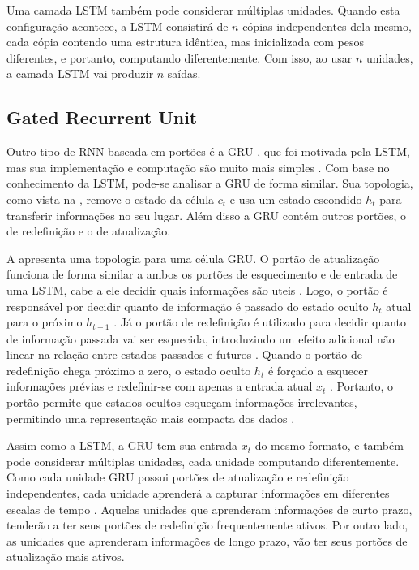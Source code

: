 Uma camada LSTM também pode considerar múltiplas unidades. Quando esta configuração acontece, a LSTM consistirá de $n$ cópias independentes dela mesmo, cada cópia contendo uma estrutura idêntica, mas inicializada com pesos diferentes, e portanto, computando diferentemente. Com isso, ao usar $n$ unidades, a camada LSTM vai produzir $n$ saídas. 

\subsection{Gated Recurrent Unit}
\label{sec:gru}

Outro tipo de \acrshort{RNN} baseada em portões é a \acrfull{GRU} \cite{gru}, que foi motivada pela \acrshort{LSTM}, mas sua implementação e computação são muito mais simples \cite{gru}. Com base no conhecimento da LSTM, pode-se analisar a GRU de forma similar. Sua topologia, como vista na , remove o estado da célula $c_t$ e usa um estado escondido $h_t$ para transferir informações no seu lugar. Além disso a GRU contém outros portões, o de redefinição e o de atualização.

%

A  apresenta uma topologia para uma célula \acrshort{GRU}. O portão de atualização funciona de forma similar a ambos os portões de esquecimento e de entrada de uma \acrshort{LSTM}, cabe a ele decidir quais informações são uteis \cite{deep_learning}. Logo, o portão é responsável por decidir quanto de informação é passado do estado oculto $h_t$ atual para o próximo $h_{t+1}$ \cite{gru}. Já o portão de redefinição é utilizado para decidir quanto de informação passada vai ser esquecida, introduzindo um efeito adicional não linear na relação entre estados passados e futuros \cite{deep_learning}. Quando o portão de redefinição chega próximo a zero, o estado oculto $h_t$ é forçado a esquecer informações prévias e redefinir-se com apenas a entrada atual $x_t$ \cite{gru}. Portanto, o portão permite que estados ocultos esqueçam informações irrelevantes, permitindo uma representação mais compacta dos dados \cite{gru}.

Assim como a \acrshort{LSTM}, a \acrshort{GRU} tem sua entrada $x_t$ do mesmo formato, e também pode considerar múltiplas unidades, cada unidade computando diferentemente. Como cada unidade \acrshort{GRU} possui portões de atualização e redefinição independentes, cada unidade aprenderá a capturar informações em diferentes escalas de tempo \cite{gru}. Aquelas unidades que aprenderam informações de curto prazo, tenderão a ter seus portões de redefinição frequentemente ativos. Por outro lado, as unidades que aprenderam informações de longo prazo, vão ter seus portões de atualização mais ativos. 


